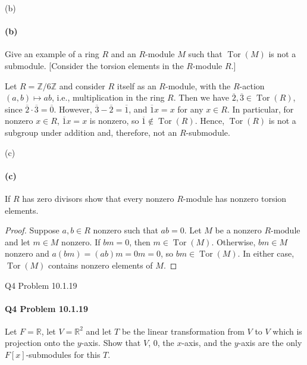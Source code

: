 \documentclass[12pt]{article}
\newenvironment{fullbox}{\begin{lrbox}{\savefullbox}\begin{minipage}{\dimexpr\textwidth-2\fboxsep\relax}}{\end{minipage}\end{lrbox}\begin{center}\framebox[\textwidth]{\usebox{\savefullbox}}\end{center}}
\newenvironment{pbox}[1][]{\begin{fullbox}\ifx#1\empty\else\paragraph{#1}\fi}{\end{fullbox}}
\theoremstyle{definition}
\newcommand{\Z}{\mathbb{Z}}
\newcommand{\R}{\mathbb{R}}
\newcommand{\Tor}{\operatorname{Tor}}
\newcommand{\eqc}{\overline}
\begin{document}
\begin{pbox}[(b)]
    Give an example of a ring $R$ and an $R$-module $M$ such that $\Tor(M)$ is not a submodule. [Consider the torsion elements in the $R$-module $R$.]
\end{pbox}

Let $R = \Z/6\Z$ and consider $R$ itself as an $R$-module, with the $R$-action $(a, b) \mapsto ab$, i.e., multiplication in the ring $R$. Then we have $\eqc{2}, \eqc{3} \in \Tor(R)$, since $\eqc{2}\cdot\eqc{3} = \eqc{0}$. However, $\eqc{3} - \eqc{2} = \eqc{1}$, and $\eqc{1}x = x$ for any $x \in R$. In particular, for nonzero $x \in R$, $\eqc{1}x = x$ is nonzero, so $\eqc{1} \notin \Tor(R)$. Hence, $\Tor(R)$ is not a subgroup under addition and, therefore, not an $R$-submodule.


\begin{pbox}[(c)]
    If $R$ has zero divisors show that every nonzero $R$-module has nonzero torsion elements.
\end{pbox}

\begin{proof}
    Suppose $a, b \in R$ nonzero such that $ab = 0$. Let $M$ be a nonzero $R$-module and let $m \in M$ nonzero. If $bm = 0$, then $m \in \Tor(M)$. Otherwise, $bm \in M$ nonzero and $a(bm) = (ab)m = 0m = 0$, so $bm \in \Tor(M)$. In either case, $\Tor(M)$ contains nonzero elements of $M$.
    
\end{proof}



\newpage
\begin{pbox}[Q4 Problem 10.1.19]
    Let $F = \R$, let $V = \R^2$ and let $T$ be the linear transformation from $V$ to $V$ which is projection onto the $y$-axis. Show that $V$, $0$, the $x$-axis, and the $y$-axis are the only $F[x]$-submodules for this $T$.
\end{pbox}
\end{document}
